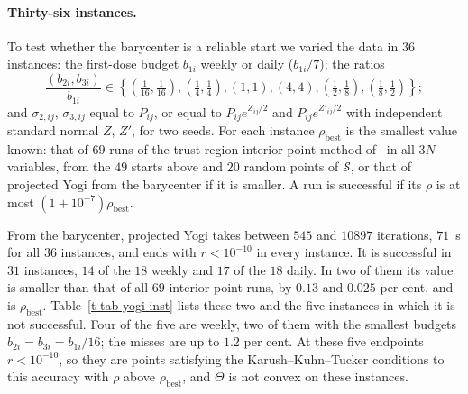 \documentclass[11pt]{article}
\theoremstyle{plain}
\theoremstyle{definition}
\theoremstyle{remark}
\numberwithin{equation}{section}
\numberwithin{figure}{section}
\numberwithin{table}{section}
\begin{document}
\paragraph{Thirty-six instances.} To test whether the barycenter is a reliable
start we varied the data in $36$ instances: the first-dose budget $b_{1i}$
weekly or daily ($b_{1i}/7$); the ratios
\begin{equation}
\frac{(b_{2i},b_{3i})}{b_{1i}}\in\left\{\left(\tfrac1{16},\tfrac1{16}\right),\left(\tfrac14,\tfrac14\right),(1,1),(4,4),\left(\tfrac12,\tfrac18\right),\left(\tfrac18,\tfrac12\right)\right\};
\end{equation}
and $\sigma_{2,ij}$, $\sigma_{3,ij}$ equal to $P_{ij}$, or equal to
$P_{ij}e^{Z_{ij}/2}$ and $P_{ij}e^{Z'_{ij}/2}$ with independent standard
normal $Z$, $Z'$, for two seeds. For each instance $\rho_{\mathrm{best}}$ is
the smallest value known: that of $69$ runs of the trust region interior point
method of~\cite{1999Byrd_Hribar_Nocedal} in all $3N$ variables, from the $49$
starts above and $20$ random points of $\mathcal{S}$, or that of
projected Yogi from the barycenter if it is smaller. A run is
successful if its $\rho$ is at most $(1+10^{-7})\rho_{\mathrm{best}}$.

From the barycenter, projected Yogi takes between $545$ and
$10897$ iterations, $71$~s for all $36$ instances, and ends with $r<10^{-10}$
in every instance. It is successful in $31$ instances, $14$ of the $18$
weekly and $17$ of the $18$ daily. In two of them its value is smaller than
that of all $69$ interior point runs, by $0.13$ and $0.025$ per cent, and is
$\rho_{\mathrm{best}}$. Table~\ref{t-tab-yogi-inst} lists these two and the
five instances in which it is not successful. Four of the five are weekly,
two of them with the smallest budgets $b_{2i}=b_{3i}=b_{1i}/16$; the misses are
up to $1.2$ per cent. At these five endpoints $r<10^{-10}$, so they are points
satisfying the Karush--Kuhn--Tucker conditions to this accuracy with $\rho$
above $\rho_{\mathrm{best}}$, and $\Theta$ is not convex on these instances.
\end{document}

